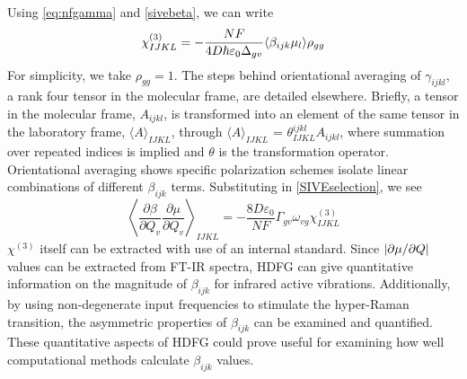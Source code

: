 \documentclass[aip, jcp, reprint, onecolumn, nofootinbib]{revtex4-2}
\begin{document}
Using \autoref{eq:nfgamma} and \autoref{sivebeta}, we can write
\begin{equation}\label{chi3}
		\chi^{(3)}_{IJKL} = -\frac{NF}{4D \hbar \varepsilon_0 \Delta_{gv}} \langle \beta_{ijk} \mu_l \rangle \rho_{gg}\\
\end{equation}
For simplicity, we take $\rho_{gg} = 1$.
The steps behind orientational averaging of $\gamma_{ijkl}$, a rank four tensor in the molecular frame, are detailed elsewhere.\cite{Andrews1977, McDonnell2024}
Briefly, a tensor in the molecular frame, $A_{ijkl}$, is transformed into an element of the same tensor in the laboratory frame, $\langle A \rangle_{IJKL}$, through $\langle A \rangle_{IJKL}$ = $\theta^{ijkl}_{IJKL} A_{ijkl}$, where summation over repeated indices is implied and $\theta$ is the transformation operator. \cite{McDonnell2024, Andrews1977}
Orientational averaging shows specific polarization schemes isolate linear combinations of different $\beta_{ijk}$ terms. \cite{Bersohn1966, Willetts1992, Kauranen1996}
Substituting in \autoref{SIVEselection}, we see
\begin{equation}\label{betasive}
	\left\langle \frac{\partial \beta}{\partial Q_v} {\frac{\partial \mu}{\partial Q_v}} \right\rangle _{IJKL} = -\frac{8D \varepsilon_0}{NF}  {\Gamma_{gv} \omega_{vg}} \chi^{(3)}_{IJKL}
\end{equation}
$\chi^{(3)}$ itself can be extracted with use of an internal standard.\cite{Levenson1974_1, Levenson1974_2}
Since $\abs{\partial \mu / \partial Q}$ values can be extracted from FT-IR spectra,\cite{RN459} HDFG can give quantitative information on the magnitude of $\beta_{ijk}$ for infrared active vibrations.
Additionally, by using non-degenerate input frequencies to stimulate the hyper-Raman transition, the asymmetric properties of $\beta_{ijk}$ can be examined and quantified. \cite{Christie1971, Denisov1986, Kozich2007}
These quantitative aspects of HDFG could prove useful for examining how well computational methods calculate $\beta_{ijk}$ values.
\end{document}
